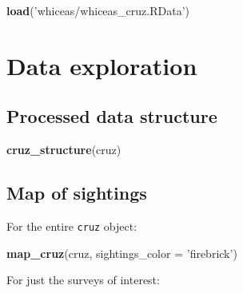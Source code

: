 \documentclass[
]{book}
\newenvironment{Shaded}{\begin{snugshade}}{\end{snugshade}}
\newcommand{\DataTypeTok}[1]{\textcolor[rgb]{0.13,0.29,0.53}{#1}}
\newcommand{\KeywordTok}[1]{\textcolor[rgb]{0.13,0.29,0.53}{\textbf{#1}}}
\newcommand{\NormalTok}[1]{#1}
\newcommand{\StringTok}[1]{\textcolor[rgb]{0.31,0.60,0.02}{#1}}
\begin{document}
\begin{Shaded}
\begin{Highlighting}[]
\KeywordTok{load}\NormalTok{(}\StringTok{'whiceas/whiceas_cruz.RData'}\NormalTok{)}
\end{Highlighting}
\end{Shaded}

\hypertarget{data-exploration}{%
\section*{Data exploration}\label{data-exploration}}

\hypertarget{processed-data-structure}{%
\subsection*{Processed data structure}\label{processed-data-structure}}

\begin{Shaded}
\begin{Highlighting}[]
\KeywordTok{cruz_structure}\NormalTok{(cruz)}
\end{Highlighting}
\end{Shaded}

\hypertarget{map-of-sightings}{%
\subsection*{Map of sightings}\label{map-of-sightings}}

For the entire \texttt{cruz} object:

\begin{Shaded}
\begin{Highlighting}[]
\KeywordTok{map_cruz}\NormalTok{(cruz, }\DataTypeTok{sightings_color =} \StringTok{'firebrick'}\NormalTok{)}
\end{Highlighting}
\end{Shaded}

For just the surveys of interest:
\end{document}
